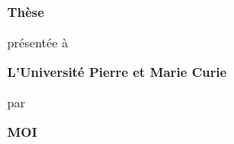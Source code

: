 
\def\auteur{MOI}
\def\upmc{Université Pierre et Marie Curie}
\def\UPMC{\MakeUppercase{\upmc}}
\def\specialite{Spécialité : Robotique}
\def\uvsq{Université de Versailles Saint-Quentin}
\def\date{??? ??? 201?}
\def\soutenue{Soutenue le \date}
\def\asoutenir{soutenance prévue le \date}


\newcommand{\Exa}{Examinateur}
\newcommand{\Exae}{Examinatrice}
\newcommand{\Rap}{Rapporteur}
\newcommand{\Rape}{Rapporteuse}
\newcommand{\hs}{\hspace{-1cm}}

\vspace*{-80pt}
\vspace{10mm}

\begin{center}
{\Huge \bf Thèse}\\
\end{center}


\begin{center}
{présentée à} \\
\end{center}


\begin{center}
{\large \bf L'\upmc}\\
\end{center}


\begin{center}
{par}\\
\end{center}


\begin{center}
{\large \bf \auteur}\\
\end{center}

